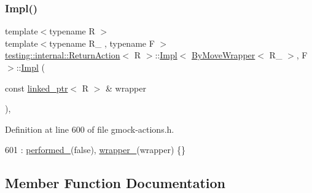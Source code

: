 \subsubsection{\texorpdfstring{Impl()}{Impl()}}
{\footnotesize\ttfamily template$<$typename R $>$ \\
template$<$typename R\+\_\+ , typename F $>$ \\
\hyperlink{classtesting_1_1internal_1_1ReturnAction}{testing\+::internal\+::\+Return\+Action}$<$ R $>$\+::\hyperlink{classtesting_1_1internal_1_1ReturnAction_1_1Impl}{Impl}$<$ \hyperlink{structtesting_1_1internal_1_1ByMoveWrapper}{By\+Move\+Wrapper}$<$ R\+\_\+ $>$, F $>$\+::\hyperlink{classtesting_1_1internal_1_1ReturnAction_1_1Impl}{Impl} (\begin{DoxyParamCaption}\item[{const \hyperlink{classtesting_1_1internal_1_1linked__ptr}{linked\+\_\+ptr}$<$ R $>$ \&}]{wrapper }\end{DoxyParamCaption})\hspace{0.3cm}{\ttfamily [inline]}, {\ttfamily [explicit]}}



Definition at line 600 of file gmock-\/actions.\+h.


\begin{DoxyCode}
601         : \hyperlink{classtesting_1_1internal_1_1ReturnAction_1_1Impl_3_01ByMoveWrapper_3_01R___01_4_00_01F_01_4_adb9db786f4a87a4a8a055ddc840f9d77}{performed\_}(\textcolor{keyword}{false}), \hyperlink{classtesting_1_1internal_1_1ReturnAction_1_1Impl_3_01ByMoveWrapper_3_01R___01_4_00_01F_01_4_a8ff130e32f8b90238cdbf7d62fe99de1}{wrapper\_}(wrapper) \{\}
\end{DoxyCode}


\subsection{Member Function Documentation}
\mbox{\label{classtesting_1_1internal_1_1ReturnAction_1_1Impl_3_01ByMoveWrapper_3_01R___01_4_00_01F_01_4_a989ee18a52a8bacfac5c9b6bfe82cf53}} 
